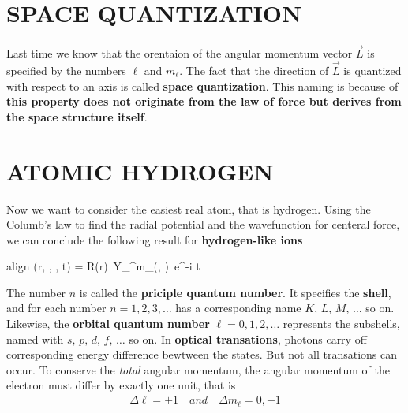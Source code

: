 \documentclass[twocolumn]{article}
\newcommand{\coloredeq}[2]{\begin{empheq}[box=\colorbox{c2}]{align}\label{#1}#2\end{empheq}}
\begin{document}
    \section{\color{c3}\MakeUppercase{space quantization}}
        \paragraph{} Last time we know that the orentaion of the angular momentum vector 
        $\vec{L}$ is specified by the numbers $\ell$ and $m_\ell$. The fact that the direction of
        $\vec{L}$ is quantized with respect to an axis is called \textbf{space quantization}. This
        naming is because of \textbf{this property does not originate from the law of force but 
        derives from the space structure itself}.

    \section{\color{c3}\MakeUppercase{atomic hydrogen}}
        Now we want to consider the easiest real atom, that is hydrogen. Using the Columb's law to
        find the radial potential and the wavefunction for centeral force, we can 
        conclude the following result for \textbf{hydrogen-like ions}
        \coloredeq{hydrogen-like equation}{
            \Psi(r, \theta, \phi, t) = R(r)\, Y_\ell^{m_\ell}(\theta, \phi)\, e^{-i \omega t}
        }
        The number $n$ is called the \textbf{priciple quantum number}. It specifies the \textbf{shell}, 
        and for each number $n=1, 2, 3, \dots$ has a corresponding name $K,\, L,\, M,\, \dots$ so on.
        Likewise, the \textbf{orbital quantum number} $\ell = 0, 1, 2, \dots$ represents the subshells, 
        named with $s,\, p,\, d,\, f,\, \dots$ so on. In \textbf{optical transations}, photons carry
        off corresponding energy difference bewtween the states. But not all transations can occur.
        To conserve the \emph{total} angular momentum, the angular momentum of the electron must differ by
        exactly one unit, that is 
        \begin{align*}
            \Delta{\ell}= \pm 1 \quad and \quad \Delta{m_\ell} = 0, \pm 1
        \end{align*}
\end{document}
